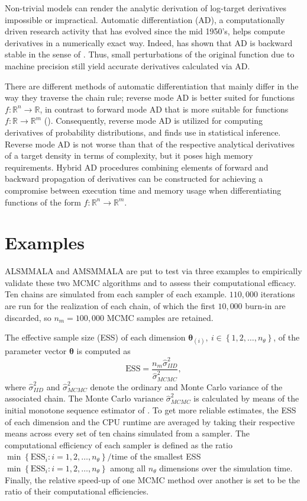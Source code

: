 \documentclass[twoside,11pt]{article}
\begin{document}
Non-trivial models can render the analytic derivation of log-target derivatives impossible or impractical. Automatic
differentiation (AD), a computationally driven research activity that has evolved since the mid 1950's, helps compute 
derivatives in a numerically exact way. Indeed, \cite{gri__ona} has shown that AD is backward stable in the sense of 
\cite{wil__mod}. Thus, small perturbations of the original function due to machine precision still yield accurate 
derivatives calculated via AD.

There are different methods of automatic differentiation that mainly differ in the way they traverse the chain rule; reverse 
mode AD is better suited for functions $f:\mathbb{R}^n\rightarrow\mathbb{R}$, in contrast to forward mode AD that is more 
suitable for functions $f:\mathbb{R}\rightarrow\mathbb{R}^m$ (\cite{gri_wal__eva}). Consequently, reverse mode AD is 
utilized for computing derivatives of probability distributions, and finds use in statistical inference. Reverse mode AD is 
not worse than that of the respective analytical derivatives of a target density in terms of complexity, but it poses high
memory requirements. Hybrid AD procedures combining elements of forward and backward propagation of derivatives can be 
constructed for achieving a compromise between execution time and memory usage when differentiating functions of the form
$f:\mathbb{R}^n\rightarrow\mathbb{R}^m$.

\section{Examples}
\label{Examples}

ALSMMALA and AMSMMALA are put to test via three examples to empirically validate these two MCMC algorithms and to assess 
their computational efficacy. Ten chains are simulated from each sampler of each example. $110,000$ iterations are run for 
the realization of each chain, of which the first $10,000$ burn-in are discarded, so $n_m=100,000$ MCMC samples are retained.

The effective sample size (ESS) of each dimension $\boldsymbol{\theta}_{(i)},~i\in\left\{1,2,\dots,n_{\theta}\right\}$,
of the parameter vector $\boldsymbol{\theta}$ is computed as
\begin{equation}
\mbox{ESS} =
\dfrac{n_m\hat{\sigma}^2_{IID}}{\hat{\sigma}^2_{MCMC}},
\end{equation}
where $\hat{\sigma}^2_{IID}$ and $\hat{\sigma}^2_{MCMC}$ denote the ordinary and Monte Carlo variance of the associated 
chain. The Monte Carlo variance $\hat{\sigma}^2_{MCMC}$ is calculated by means of the initial monotone sequence estimator of
\cite{gey__pra}. To get more reliable estimates, the ESS of each dimension and the CPU runtime are averaged by taking their
respective means across every set of ten chains simulated from a sampler. The computational efficiency of each sampler is
defined as the ratio $\min\left\{\mbox{ESS}_i:i=1,2,\dots,n_{\theta}\right\}/\mbox{time}$ of the smallest ESS
$\min\left\{\mbox{ESS}_i:i=1,2,\dots,n_{\theta}\right\}$ among all $n_{\theta}$ dimensions over the simulation time. Finally,
the relative speed-up of one MCMC method over another is set to be the ratio of their computational efficiencies.
\end{document}

